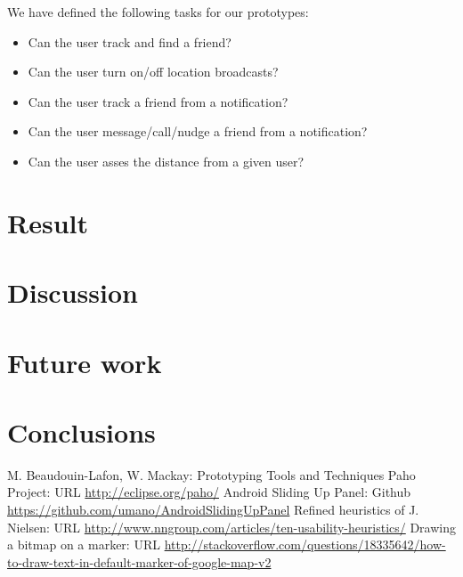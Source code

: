 \documentclass[runningheads,a4paper]{llncs}
\begin{document}
We  have defined the following tasks for our prototypes:\\
\begin{itemize}
\item Can the user track and find a friend? 
\item Can the user turn on/off location broadcasts? 
\item Can the user track a friend from a notification?
\item Can the user message/call/nudge a friend from a notification?
\item Can the user asses the distance from a given user?
\end{itemize}




\section{Result}
\section{Discussion}
\section{Future work}
\section{Conclusions}

\begin{thebibliography}{4}

 M. Beaudouin-Lafon, W. Mackay: Prototyping Tools and Techniques
 Paho Project: URL \url{http://eclipse.org/paho/}
 Android Sliding Up Panel: Github \url{https://github.com/umano/AndroidSlidingUpPanel}
Refined heuristics of J. Nielsen: URL \url{http://www.nngroup.com/articles/ten-usability-heuristics/}
 Drawing a bitmap on a marker: URL \url{http://stackoverflow.com/questions/18335642/how-to-draw-text-in-default-marker-of-google-map-v2}



\end{thebibliography}
\end{document}
